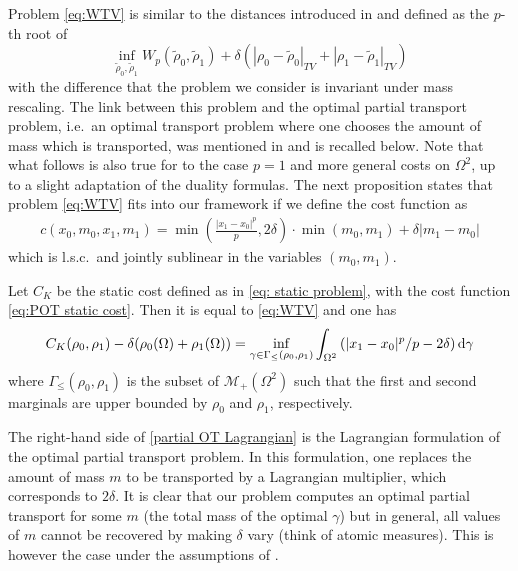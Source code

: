 %
Problem \eqref{eq:WTV} is similar to the distances introduced in \cite{piccoli2013properties} and \cite{piccoli2014generalized} defined as the $p$-th root of 
\begin{equation}\label{eq:PiccoliRossi}
\inf_{\tilde{\rho}_0, \tilde{\rho}_1} W_p(\tilde{\rho}_0,\tilde{\rho}_1) + \delta(|\rho_0- \tilde{\rho}_0|_{TV}+|\rho_1 - \tilde{\rho}_1|_{TV})
\end{equation}
with the difference that the problem we consider is invariant under mass rescaling. The link between this problem and the optimal partial transport problem, i.e.\ an optimal transport problem where one chooses the amount of mass which is transported, was mentioned in \cite{ChizatOTFR2015} and is recalled below.
%
Note that what follows is also true for to the case $p=1$ and more general costs on $\Omega^2$, up to a slight adaptation of the duality formulas. 
%
The next proposition states that problem \eqref{eq:WTV} fits into our framework if we define the cost function as
\begin{align}
\label{eq:POT static cost}
c(x_0,m_0,x_1,m_1) =
\min \left( \frac{|x_1-x_0|^p}{p} ,2\delta\right) \cdot \min (m_0,m_1) + \delta |m_1-m_0|
\end{align}
which is l.s.c.\ and jointly sublinear in the variables $(m_0,m_1)$. 
%
\begin{proposition}
Let $C_K$ be the static cost defined as in \eqref{eq: static problem}, with the cost function \eqref{eq:POT static cost}. Then it is equal to \eqref{eq:WTV} and one has
\begin{equation}
\label{partial OT Lagrangian}
C_K(\rho_0,\rho_1) - \delta (\rho_0(\Omega)+\rho_1(\Omega)) = \inf_{\gamma \in \Gamma_{\leq}(\rho_0,\rho_1)}\int_{\Omega^2} \left( |x_1-x_0|^p/p - 2\delta \right) \mathrm{d} \gamma
\end{equation}
where $\Gamma_{\leq}(\rho_0,\rho_1)$ is the subset of $\mathcal{M}_+(\Omega^2)$ such that the first and second marginals are upper bounded by $\rho_0$ and $\rho_1$, respectively.
\end{proposition}
\begin{remark}
The right-hand side of \eqref{partial OT Lagrangian} is the Lagrangian formulation of the optimal partial transport problem. In this formulation, one replaces the amount of mass $m$ to be transported by a Lagrangian multiplier, which corresponds to $2\delta$. It is clear that our problem computes an optimal partial transport for some $m$ (the total mass of the optimal $\gamma$) but in general, all values of $m$ cannot be recovered by making $\delta$ vary (think of atomic measures). This is however the case under the assumptions of \cite[Corollary 2.11]{caffarelli2010free}.
\end{remark}

